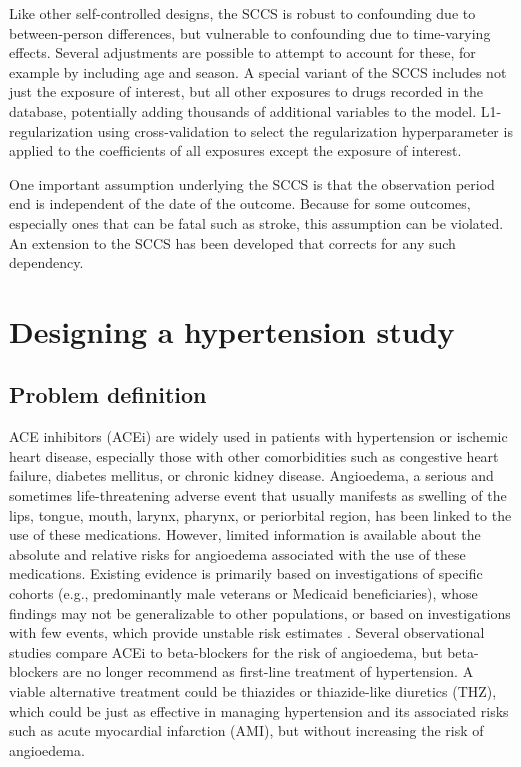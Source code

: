 \documentclass[11pt]{book}
\theoremstyle{definition}
\theoremstyle{definition}
\theoremstyle{definition}
\theoremstyle{remark}
\begin{document}
Like other self-controlled designs, the SCCS is robust to confounding due to between-person differences, but vulnerable to confounding due to time-varying effects. Several adjustments are possible to attempt to account for these, for example by including age and season. A special variant of the SCCS includes not just the exposure of interest, but all other exposures to drugs recorded in the database, \citep{simpson_2013} potentially adding thousands of additional variables to the model. L1-regularization using cross-validation to select the regularization hyperparameter is applied to the coefficients of all exposures except the exposure of interest.

One important assumption underlying the SCCS is that the observation period end is independent of the date of the outcome. Because for some outcomes, especially ones that can be fatal such as stroke, this assumption can be violated. An extension to the SCCS has been developed that corrects for any such dependency. \citep{farrington_2011}

\hypertarget{designing-a-hypertension-study}{%
\section{Designing a hypertension study}\label{designing-a-hypertension-study}}

\hypertarget{problem-definition-1}{%
\subsection{Problem definition}\label{problem-definition-1}}

ACE inhibitors (ACEi) are widely used in patients with hypertension or ischemic heart disease, especially those with other comorbidities such as congestive heart failure, diabetes mellitus, or chronic kidney disease. \citep{zaman_2002} Angioedema, a serious and sometimes life-threatening adverse event that usually manifests as swelling of the lips, tongue, mouth, larynx, pharynx, or periorbital region, has been linked to the use of these medications. \citep{sabroe_1997} However, limited information is available about the absolute and relative risks for angioedema associated with the use of these medications. Existing evidence is primarily based on investigations of specific cohorts (e.g., predominantly male veterans or Medicaid beneficiaries), whose findings may not be generalizable to other populations, or based on investigations with few events, which provide unstable risk estimates \citep{powers_2012}. Several observational studies compare ACEi to beta-blockers for the risk of angioedema, \citep{magid_2010, toh_2012} but beta-blockers are no longer recommend as first-line treatment of hypertension. \citep{whelton_2018} A viable alternative treatment could be thiazides or thiazide-like diuretics (THZ), which could be just as effective in managing hypertension and its associated risks such as acute myocardial infarction (AMI), but without increasing the risk of angioedema.
\end{document}
